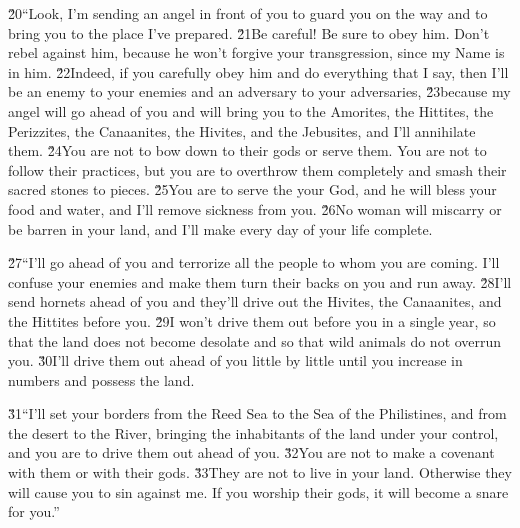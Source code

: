 \v{20}``Look, I'm sending an angel in front of you to guard you on the way and to bring you to the place I've prepared. \v{21}Be careful! Be sure to obey him. Don't rebel against him, because he won't forgive your transgression, since my Name is in him. \v{22}Indeed, if you carefully obey him and do everything that I say, then I'll be an enemy to your enemies and an adversary to your adversaries, \v{23}because my angel will go ahead of you and will bring you to the Amorites, the Hittites, the Perizzites, the Canaanites, the Hivites, and the Jebusites, and I'll annihilate them. \v{24}You are not to bow down to their gods or serve them. You are not to follow their practices, but you are to overthrow them completely and smash their sacred stones to pieces. \v{25}You are to serve the  your God, and he will bless your food and water, and I'll remove sickness from you. \v{26}No woman will miscarry or be barren in your land, and I'll make every day of your life complete.

\v{27}``I'll go ahead of you and terrorize all the people to whom you are coming. I'll confuse your enemies and make them turn their backs on you and run away. \v{28}I'll send hornets ahead of you and they'll drive out the Hivites, the Canaanites, and the Hittites before you. \v{29}I won't drive them out before you in a single year, so that the land does not become desolate and so that wild animals do not overrun you. \v{30}I'll drive them out ahead of you little by little until you increase in numbers and possess the land.

\v{31}``I'll set your borders from the Reed Sea to the Sea of the Philistines, and from the desert to the River, bringing the inhabitants of the land under your control, and you are to drive them out ahead of you. \v{32}You are not to make a covenant with them or with their gods. \v{33}They are not to live in your land. Otherwise they will cause you to sin against me. If you worship their gods, it will become a snare for you.''

